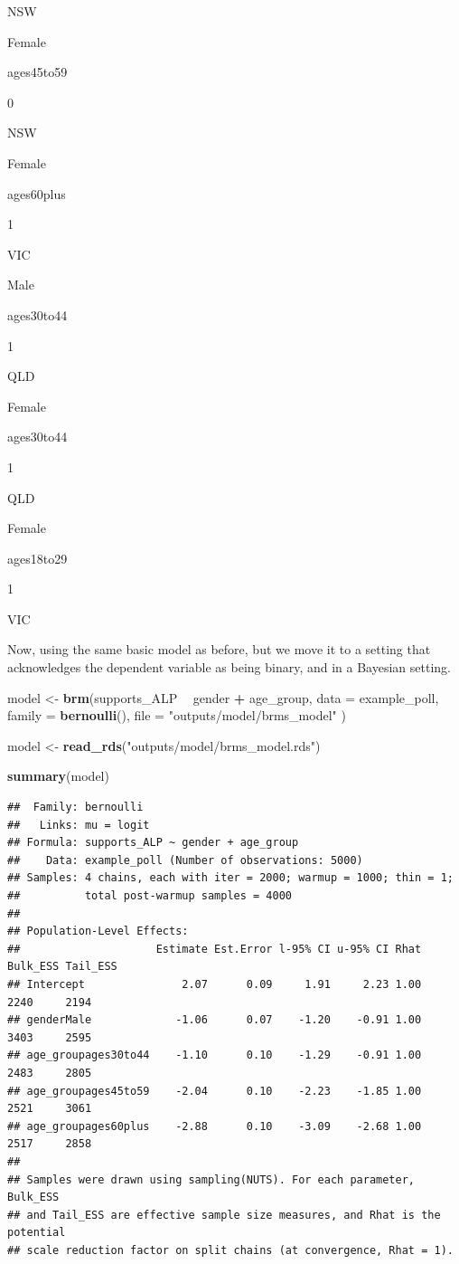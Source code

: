 \documentclass[
]{book}
\newenvironment{Shaded}{\begin{snugshade}}{\end{snugshade}}
\newcommand{\DataTypeTok}[1]{\textcolor[rgb]{0.13,0.29,0.53}{#1}}
\newcommand{\KeywordTok}[1]{\textcolor[rgb]{0.13,0.29,0.53}{\textbf{#1}}}
\newcommand{\NormalTok}[1]{#1}
\newcommand{\OperatorTok}[1]{\textcolor[rgb]{0.81,0.36,0.00}{\textbf{#1}}}
\newcommand{\StringTok}[1]{\textcolor[rgb]{0.31,0.60,0.02}{#1}}
\begin{document}
NSW

Female

ages45to59

0

NSW

Female

ages60plus

1

VIC

Male

ages30to44

1

QLD

Female

ages30to44

1

QLD

Female

ages18to29

1

VIC

Now, using the same basic model as before, but we move it to a setting that acknowledges the dependent variable as being binary, and in a Bayesian setting.

\begin{Shaded}
\begin{Highlighting}[]
\NormalTok{model <-}\StringTok{ }\KeywordTok{brm}\NormalTok{(supports_ALP }\OperatorTok{~}\StringTok{ }\NormalTok{gender }\OperatorTok{+}\StringTok{ }\NormalTok{age_group, }
             \DataTypeTok{data =}\NormalTok{ example_poll, }
             \DataTypeTok{family =} \KeywordTok{bernoulli}\NormalTok{(),}
             \DataTypeTok{file =} \StringTok{"outputs/model/brms_model"}
\NormalTok{             )}

\NormalTok{model <-}\StringTok{ }\KeywordTok{read_rds}\NormalTok{(}\StringTok{"outputs/model/brms_model.rds"}\NormalTok{)}

\KeywordTok{summary}\NormalTok{(model)}
\end{Highlighting}
\end{Shaded}

\begin{verbatim}
##  Family: bernoulli 
##   Links: mu = logit 
## Formula: supports_ALP ~ gender + age_group 
##    Data: example_poll (Number of observations: 5000) 
## Samples: 4 chains, each with iter = 2000; warmup = 1000; thin = 1;
##          total post-warmup samples = 4000
## 
## Population-Level Effects: 
##                     Estimate Est.Error l-95% CI u-95% CI Rhat Bulk_ESS Tail_ESS
## Intercept               2.07      0.09     1.91     2.23 1.00     2240     2194
## genderMale             -1.06      0.07    -1.20    -0.91 1.00     3403     2595
## age_groupages30to44    -1.10      0.10    -1.29    -0.91 1.00     2483     2805
## age_groupages45to59    -2.04      0.10    -2.23    -1.85 1.00     2521     3061
## age_groupages60plus    -2.88      0.10    -3.09    -2.68 1.00     2517     2858
## 
## Samples were drawn using sampling(NUTS). For each parameter, Bulk_ESS
## and Tail_ESS are effective sample size measures, and Rhat is the potential
## scale reduction factor on split chains (at convergence, Rhat = 1).
\end{verbatim}
\end{document}

